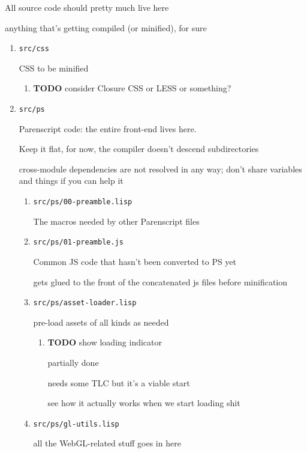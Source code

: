 \documentclass[11pt]{article}
\begin{document}
\begin{enumerate}
\begin{enumerate}
All source code should pretty much live here

anything that's getting compiled (or minified), for sure

\begin{enumerate}
\item \texttt{src/css}
\label{sec-5-4-1-4-1}

CSS to be minified

\begin{enumerate}
\item {\bfseries\sffamily TODO} consider Closure CSS or LESS or something?
\label{sec-5-4-1-4-1-1}
\end{enumerate}
\item \texttt{src/ps}
\label{sec-5-4-1-4-2}

Parenscript code: the entire front-end lives here.

Keep it flat, for now, the compiler doesn't descend subdirectories

cross-module dependencies are not resolved in any way; don't share
variables and things if you can help it


\begin{enumerate}
\item \texttt{src/ps/00-preamble.lisp}
\label{sec-5-4-1-4-2-1}

The macros needed by other Parenscript files
\item \texttt{src/ps/01-preamble.js}
\label{sec-5-4-1-4-2-2}

Common JS code that hasn't been converted to PS yet

gets glued to the front of the concatenated js files before
minification
\item \texttt{src/ps/asset-loader.lisp}
\label{sec-5-4-1-4-2-3}

pre-load assets of all kinds as needed

\begin{enumerate}
\item {\bfseries\sffamily TODO} show loading indicator
\label{sec-5-4-1-4-2-3-1}

partially done

needs some TLC but it's a viable start

see how it actually works when we start loading shit
\end{enumerate}
\item \texttt{src/ps/gl-utils.lisp}
\label{sec-5-4-1-4-2-4}


all the WebGL-related stuff goes in here


\end{enumerate}
\end{enumerate}
\end{enumerate}
\end{enumerate}
\end{document}
